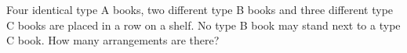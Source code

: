 Four identical type A books, two different type B books and three different type C books are placed in a row on a shelf. No type B book may stand next to a type C book. How many arrangements are there?
